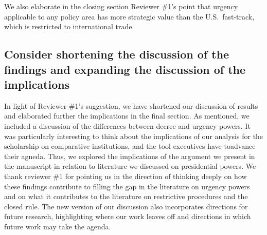 \documentclass[article,letterpaper,times,12pt,listings-bw,microtype]{article}
\begin{document}
We also elaborate in the closing section Reviewer \#1's point that urgency applicable to any policy area has more strategic value than the U.S.\ fast-track, which is restricted to international trade.



\subsection{Consider shortening the discussion of the findings and expanding the discussion of the implications} In light of Reviewer \#1's suggestion, we have shortened our discussion of results and elaborated further the implications in the final section. As mentioned, we included a discussion of the differences between decree and urgency powers. It was particularly interesting to think about the implications of our analysis for the scholarship on comparative institutions, and the tool executives have toadvance their agneda. Thus, we explored the implications of the argument we present in the manuscript in relation to literature we discussed on presidential powers. We thank reviewer \#1 for pointing us in the direction of thinking deeply on how these findings contribute to filling the gap in the literature on urgency powers and on what it contributes to the literature on restrictive procedures and the closed rule. The new version of our discussion also incorporates directions for future research, highlighting where our work leaves off and directions in which future work may take the agenda. 
\end{document}
